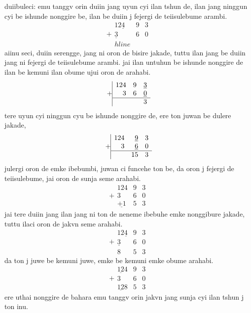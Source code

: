 \documentclass{report}
\begin{document}
duiibuleci: emu tanggv orin duiin jang uyun cyi ilan tshun de, ilan jang ninggun cyi be ishunde nonggire be, ilan be duiin j fejergi de teiisulebume arambi.\\
\[
    +\begin{array}{|rrr}
        12\underline{4} & 9 & 3\\
        \underline{3} & 6 & 0\\hline
    \end{array}
\]
aiinu seci, duiin serengge, jang ni oron de bisire jakade, tuttu ilan jang be duiin jang ni fejergi de teiisulebume arambi. jai ilan untuhun be ishunde nonggire de ilan be kemuni ilan obume ujui oron de arahabi.
\[
    +\begin{array}{|rrr}
        124 & 9 & \underline{3}\\
        3 & 6 & \underline{0}\\\hline
         & & 3
    \end{array}
\]
tere uyun cyi ninggun cyu be ishunde nonggire de, ere ton juwan be dulere jakade,
\[
    +\begin{array}{|rrr}
        12{4} & \underline{9} & 3\\
        {3} & \underline{6} & 0\\\hline
         & 15 & 3
    \end{array}
\]
julergi oron de emke ibebumbi, juwan ci funcehe ton be, da oron j fejergi de teiisulebume, jai oron de sunja seme arahabi.
\[
    +\begin{array}{|rrr}
        12{4} & 9 & 3\\
        {3} & 6 & 0\\\hline
        \underline{+1} & 5 & 3
    \end{array}
\]
jai tere duiin jang ilan jang ni ton de neneme ibebuhe emke nonggibure jakade, tuttu ilaci oron de jakvn seme arahabi.
\[
    +\begin{array}{|rrr}
        12\underline{4} & 9 & 3\\
        \underline{3} & 6 & 0\\\hline
        8 & 5 & 3
    \end{array}
\]
da ton j juwe be kemuni juwe, emke be kemuni emke obume arahabi.
\[
    +\begin{array}{|rrr}
        \underline{12}{4} & 9 & 3\\
        {3} & 6 & 0\\\hline
        \underline{12}8 & 5 & 3
    \end{array}
\]
ere uthai nonggire de bahara emu tanggv orin jakvn jang sunja cyi ilan tshun j ton inu.\\
\end{document}

